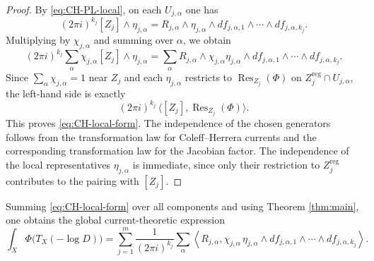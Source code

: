 \documentclass[12pt,a4paper,dvipsnames,x11names]{amsart}
\numberwithin{equation}{section}
\theoremstyle{plain}
\theoremstyle{definition}
\theoremstyle{remark}
\newcommand{\reg}{\mathrm{reg}}
\begin{document}
\begin{proof}
By \eqref{eq:CH-PL-local}, on each $U_{j,\alpha}$ one has
$$
(2\pi i)^{k_j}[Z_j]\wedge \eta_{j,\alpha}
=
R_{j,\alpha}\wedge \eta_{j,\alpha}\wedge
df_{j,\alpha,1}\wedge\cdots\wedge df_{j,\alpha,k_j}.
$$
Multiplying by $\chi_{j,\alpha}$ and summing over $\alpha$, we obtain
$$
(2\pi i)^{k_j}\sum_\alpha \chi_{j,\alpha}[Z_j]\wedge \eta_{j,\alpha}
=
\sum_\alpha
R_{j,\alpha}\wedge \chi_{j,\alpha}\eta_{j,\alpha}\wedge
df_{j,\alpha,1}\wedge\cdots\wedge df_{j,\alpha,k_j}.
$$
Since $\sum_\alpha \chi_{j,\alpha}=1$ near $Z_j$ and each $\eta_{j,\alpha}$ restricts to $\operatorname{Res}_{Z_j}(\Phi)$ on $Z_j^{\reg}\cap U_{j,\alpha}$, the left-hand side is exactly
$$
(2\pi i)^{k_j}\,\langle [Z_j],\operatorname{Res}_{Z_j}(\Phi)\rangle.
$$
This proves \eqref{eq:CH-local-form}. The independence of the chosen generators follows from the transformation law for Coleff--Herrera currents and the corresponding transformation law for the Jacobian factor. The independence of the local representatives $\eta_{j,\alpha}$ is immediate, since only their restriction to $Z_j^{\reg}$ contributes to the pairing with $[Z_j]$.
\end{proof}

Summing \eqref{eq:CH-local-form} over all components and using Theorem \ref{thm:main}, one obtains the global current-theoretic expression
$$
\int_X \Phi\bigl(T_X(-\log D)\bigr)
=
\sum_{j=1}^m
\frac{1}{(2\pi i)^{k_j}}
\sum_\alpha
\left\langle
R_{j,\alpha},
\chi_{j,\alpha}\,\eta_{j,\alpha}\wedge
df_{j,\alpha,1}\wedge\cdots\wedge df_{j,\alpha,k_j}
\right\rangle.
$$
\end{document}

